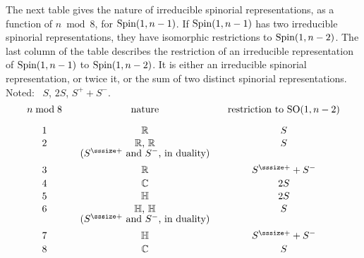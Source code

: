 The next table gives the nature of irreducible spinorial
representations, as a function of $n\bmod{8}$, for
$\text{\rm Spin}(1,n-1)$.
If $\text{\rm Spin}(1,n-1)$ has two irreducible spinorial
representations, they have isomorphic restrictions to
$\text{\rm Spin}(1,n-2)$.
The last column of the table describes the restriction of
an irreducible representation of $\text{\rm Spin}(1,n-1)$ to
$\text{\rm Spin}(1,n-2)$.
It is either an irreducible spinorial representation, or
twice it, or the sum of two distinct spinorial
representations.
Noted: \ $S$, $2S$, $S^{\plus}+S^-$.
$$
\vbox{\offinterlineskip\tabskip=15pt
\halign{\hfill #\hfill &\hfill #\hfill
  &\hfill #\hfill\cr
$n\bmod{8}$ &nature &restriction to $\SO(1,n-2)$\cr
\noalign{\bigskip}
$1$ &$\dbR$ &$S$\cr
\noalign{\medskip}
$2$ &$\dbR$, $\dbR$ &$S$\cr
    &($S^{\plus}$ and $S^-$, in duality) &\cr
\noalign{\medskip}
$3$ &$\dbR$ &$S^{\plus}+S^-$\cr
\noalign{\medskip}
$4$ &$\dbC$ &$2S$\cr
\noalign{\medskip}
$5$ &$\dbH$ &$2S$\cr
\noalign{\medskip}
$6$ &$\dbH$, $\dbH$ &$S$\cr
    &($S^{\plus}$ and $S^-$, in duality) &\cr
\noalign{\medskip}
$7$ &$\dbH$ &$S^{\plus}+S^-$\cr
\noalign{\medskip}
$8$ &$\dbC$ &$S$\cr}}
$$

\enddocument

